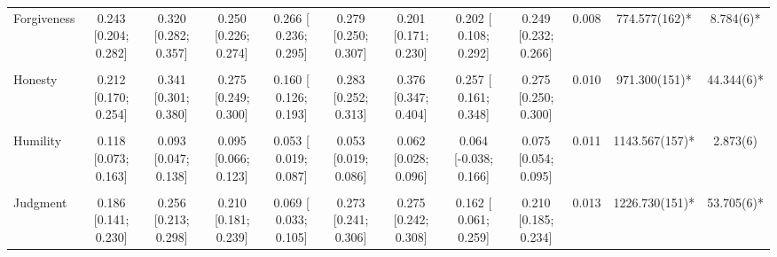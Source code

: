 \documentclass[
  letterpaper,
  DIV=11,
  numbers=noendperiod]{scrartcl}
\begin{document}
\begin{table}[H]
{\begin{tabular}[t]{lccccccccccc}
\addlinespace
Forgiveness & 0.243 [0.204; 0.282] & 0.320 [0.282; 0.357] & 0.250 [0.226; 0.274] & 0.266 [ 0.236; 0.295] & 0.279 [0.250; 0.307] & 0.201 [0.171; 0.230] & 0.202 [ 0.108; 0.292] & 0.249 [0.232; 0.266] & 0.008 & 774.577(162)* & 8.784(6)*\\
\cellcolor{gray!10}{Gratitude} & \cellcolor{gray!10}{0.313 [0.268; 0.358]} & \cellcolor{gray!10}{0.519 [0.482; 0.554]} & \cellcolor{gray!10}{0.487 [0.461; 0.513]} & \cellcolor{gray!10}{0.227 [ 0.190; 0.263]} & \cellcolor{gray!10}{0.434 [0.403; 0.464]} & \cellcolor{gray!10}{0.425 [0.393; 0.455]} & \cellcolor{gray!10}{0.391 [ 0.297; 0.477]} & \cellcolor{gray!10}{0.435 [0.412; 0.457]} & \cellcolor{gray!10}{0.019} & \cellcolor{gray!10}{2863.571(176)*} & \cellcolor{gray!10}{114.851(6)*}\\
Honesty & 0.212 [0.170; 0.254] & 0.341 [0.301; 0.380] & 0.275 [0.249; 0.300] & 0.160 [ 0.126; 0.193] & 0.283 [0.252; 0.313] & 0.376 [0.347; 0.404] & 0.257 [ 0.161; 0.348] & 0.275 [0.250; 0.300] & 0.010 & 971.300(151)* & 44.344(6)*\\
\cellcolor{gray!10}{Hope} & \cellcolor{gray!10}{0.357 [0.307; 0.405]} & \cellcolor{gray!10}{0.674 [0.643; 0.703]} & \cellcolor{gray!10}{0.558 [0.529; 0.586]} & \cellcolor{gray!10}{0.384 [ 0.344; 0.422]} & \cellcolor{gray!10}{0.581 [0.551; 0.610]} & \cellcolor{gray!10}{0.523 [0.489; 0.556]} & \cellcolor{gray!10}{0.554 [ 0.471; 0.627]} & \cellcolor{gray!10}{0.534 [0.504; 0.563]} & \cellcolor{gray!10}{0.032} & \cellcolor{gray!10}{3535.491(170)*} & \cellcolor{gray!10}{126.908(6)*}\\
Humility & 0.118 [0.073; 0.163] & 0.093 [0.047; 0.138] & 0.095 [0.066; 0.123] & 0.053 [ 0.019; 0.087] & 0.053 [0.019; 0.086] & 0.062 [0.028; 0.096] & 0.064 [-0.038; 0.166] & 0.075 [0.054; 0.095] & 0.011 & 1143.567(157)* & 2.873(6)\\
\addlinespace
\cellcolor{gray!10}{Humor} & \cellcolor{gray!10}{0.238 [0.198; 0.276]} & \cellcolor{gray!10}{0.431 [0.396; 0.464]} & \cellcolor{gray!10}{0.271 [0.247; 0.294]} & \cellcolor{gray!10}{0.126 [ 0.096; 0.156]} & \cellcolor{gray!10}{0.323 [0.297; 0.350]} & \cellcolor{gray!10}{0.316 [0.289; 0.343]} & \cellcolor{gray!10}{0.287 [ 0.199; 0.372]} & \cellcolor{gray!10}{0.277 [0.255; 0.298]} & \cellcolor{gray!10}{0.008} & \cellcolor{gray!10}{1400.857(172)*} & \cellcolor{gray!10}{74.981(6)*}\\
Judgment & 0.186 [0.141; 0.230] & 0.256 [0.213; 0.298] & 0.210 [0.181; 0.239] & 0.069 [ 0.033; 0.105] & 0.273 [0.241; 0.306] & 0.275 [0.242; 0.308] & 0.162 [ 0.061; 0.259] & 0.210 [0.185; 0.234] & 0.013 & 1226.730(151)* & 53.705(6)*\\

\end{tabular}}
\end{table}
\end{document}
